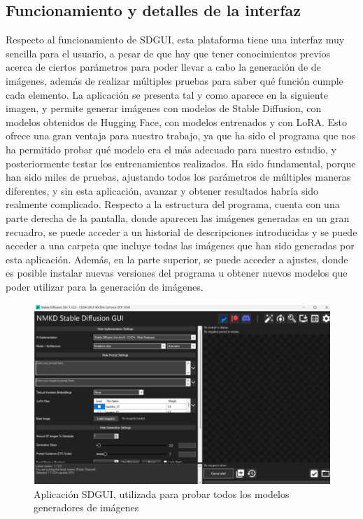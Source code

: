 \subsection{Funcionamiento y detalles de la interfaz}

 Respecto al funcionamiento de SDGUI, esta plataforma tiene una interfaz muy sencilla para el usuario, a pesar de que hay que tener conocimientos previos acerca de ciertos parámetros para poder llevar a cabo la generación de de imágenes, además de realizar múltiples pruebas para saber qué función cumple cada elemento. La aplicación se presenta tal y como aparece en la siguiente imagen, y permite generar imágenes con modelos de Stable Diffusion, con modelos obtenidos de Hugging Face, con modelos entrenados y con LoRA. Esto ofrece una gran ventaja para nuestro trabajo, ya que ha sido el programa que nos ha permitido probar qué modelo era el más adecuado para nuestro estudio, y posteriormente testar los entrenamientos realizados. Ha sido fundamental, porque han sido miles de pruebas, ajustando todos los parámetros de múltiples maneras diferentes, y sin esta aplicación, avanzar y obtener resultados habría sido realmente complicado. Respecto a la estructura del programa, cuenta con una parte derecha de la pantalla, donde aparecen las imágenes generadas en un gran recuadro, se puede acceder a un historial de descripciones introducidas y se puede acceder a una carpeta que incluye todas las imágenes que han sido generadas por esta aplicación. Además, en la parte superior, se puede acceder a ajustes, donde es posible instalar nuevas versiones del programa u obtener nuevos modelos que poder utilizar para la generación de imágenes. \\
 
 
 \begin{figure}[h]
 	\centering
 	\includegraphics[width = 1
 	\textwidth]{Imagenes/Vectorial/nmkdsdgui.png}
 	\caption{Aplicación SDGUI, utilizada para probar todos los modelos generadores de imágenes }
 	\label{fig:nmkdsdgui}
 \end{figure}
 
